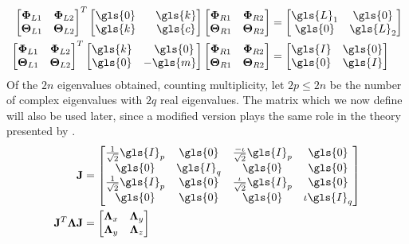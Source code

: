 \begin{align}
\label{eqn:stsp_eig}
	\begin{bmatrix}
		\mathbf{\Phi}_{L1} & \mathbf{\Phi}_{L2}\\
		\mathbf{\Theta}_{L1} & \mathbf{\Theta}_{L2}
	\end{bmatrix}^T
	\begin{bmatrix}
		\gls{0} & \phantom{-}\gls{k}\\
		\gls{k} & \phantom{-}\gls{c}
	\end{bmatrix}
	\begin{bmatrix}
		\mathbf{\Phi}_{R1} & \mathbf{\Phi}_{R2}\\
		\mathbf{\Theta}_{R1} & \mathbf{\Theta}_{R2}
	\end{bmatrix} &= 
	\begin{bmatrix}
		\gls{L}_1 & \gls{0}\\
		\gls{0} & \gls{L}_2
	\end{bmatrix}\\	
	\begin{bmatrix}
		\mathbf{\Phi}_{L1} & \mathbf{\Phi}_{L2}\\
		\mathbf{\Theta}_{L1} & \mathbf{\Theta}_{L2}
	\end{bmatrix}^T
	\begin{bmatrix}
		\gls{k} & \phantom{-}\gls{0}\\
		\gls{0} & -\gls{m}
	\end{bmatrix}
	\begin{bmatrix}
		\mathbf{\Phi}_{R1} & \mathbf{\Phi}_{R2}\\
		\mathbf{\Theta}_{R1} & \mathbf{\Theta}_{R2}
	\end{bmatrix} &= 
	\begin{bmatrix}
		\gls{I} & \gls{0} \\
		\gls{0}  & \gls{I} 
	\end{bmatrix}
\end{align}
Of the $2n$ eigenvalues obtained, counting multiplicity, let $2p \leq 2n$
be the number of complex eigenvalues with $2q$ real eigenvalues. The matrix 
which we now define will also be used later, since a modified version plays 
the same role in the theory presented by \citet{Chu200896}.
\begin{align}
	\mathbf{J} &= \begin{bmatrix}
	\frac{1}{\sqrt{2}}\gls{I}_p & \gls{0} & \frac{-\iota}{\sqrt{2}}\gls{I}_p & \gls{0} \\
	\gls{0} & \gls{I}_q & \gls{0} & \gls{0} \\
	\frac{1}{\sqrt{2}}\gls{I}_p & \gls{0} & \frac{\iota}{\sqrt{2}}\gls{I}_p & \gls{0} \\
	\gls{0} & \gls{0} & \gls{0} & \iota\gls{I}_q \\
	\end{bmatrix}\\
\mathbf{J}^T\mathbf{\Lambda}\mathbf{J} &= \begin{bmatrix}
		\mathbf{\Lambda}_x & \mathbf{\Lambda}_y\\
		\mathbf{\Lambda}_y & \mathbf{\Lambda}_z
	\end{bmatrix}
\end{align}
